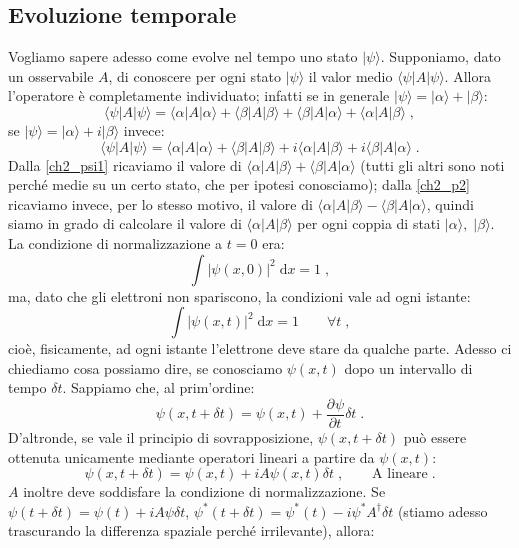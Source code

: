 \documentclass[12pt,a4paper]{report}
\theoremstyle{definition}
\newcommand{\pdev}[3][]{\frac{\partial^{#1} #2}{\partial #3^{#1}}}
\numberwithin{equation}{section}
\newcommand{\diff}[1][]{\mathrm{d}#1}
\newcommand{\bra}{\langle}
\newcommand{\ket}{\rangle}
\begin{document}
\subsection{Evoluzione temporale}
Vogliamo sapere adesso come evolve nel tempo uno stato $|\psi\ket$. Supponiamo, dato un osservabile $A$, di conoscere per ogni stato $|\psi\ket$ il valor medio $\bra\psi|A|\psi\ket$. Allora l'operatore è completamente individuato; infatti se in generale $|\psi\ket=|\alpha\ket+|\beta\ket$:
\begin{equation}
\bra\psi|A|\psi\ket=\bra\alpha|A|\alpha\ket+\bra\beta|A|\beta\ket+\bra\beta|A|\alpha\ket+\bra\alpha|A|\beta\ket\;,\label{ch2_psi1}
\end{equation}
se $|\psi\ket=|\alpha\ket+i|\beta\ket$ invece:
\begin{equation}
\bra\psi|A|\psi\ket=\bra\alpha|A|\alpha\ket+\bra\beta|A|\beta\ket+i\bra\alpha|A|\beta\ket+i\bra\beta|A|\alpha\ket\;.\label{ch2_psi2}
\end{equation}
Dalla \eqref{ch2_psi1} ricaviamo il valore di $\bra\alpha|A|\beta\ket+\bra\beta|A|\alpha\ket$ (tutti gli altri sono noti perché medie su un certo stato, che per ipotesi conosciamo); dalla \eqref{ch2_p2} ricaviamo invece, per lo stesso motivo, il valore di $\bra\alpha|A|\beta\ket-\bra\beta|A|\alpha\ket$, quindi siamo in grado di calcolare il valore di $\bra\alpha|A|\beta\ket$ per ogni coppia di stati $|\alpha\ket,\;|\beta\ket$. \\
La condizione di normalizzazione a $t=0$ era:
$$
\int |\psi(x,0)|^2\;\diff{x}=1\;,
$$
ma, dato che gli elettroni non spariscono, la condizioni vale ad ogni istante:
\begin{equation}
\int |\psi(x,t)|^2\;\diff{x}=1\qquad \forall t\;,
\end{equation}
cioè, fisicamente, ad ogni istante l'elettrone deve stare da qualche parte. Adesso ci chiediamo cosa possiamo dire, se conosciamo $\psi(x,t)$ dopo un intervallo di tempo $\delta t$. Sappiamo che, al prim'ordine:
\begin{equation}
\psi(x,t+\delta t)=\psi(x,t)+\pdev{\psi}{t}\delta t\;.
\end{equation}
D'altronde, se vale il principio di sovrapposizione, $\psi(x,t+\delta t)$ può essere ottenuta unicamente mediante operatori lineari a partire da $\psi(x,t)$:
\begin{equation}
\psi(x,t+\delta t)=\psi(x,t)+iA\psi(x,t)\delta t\;,\qquad \mbox{A lineare}\;.
\end{equation}
$A$ inoltre deve soddisfare la condizione di normalizzazione. Se $\psi(t+\delta t)=\psi(t)+iA\psi\delta t$, $\psi^*(t+\delta t)=\psi^*(t)-i\psi^*A^{\dagger}\delta t$ (stiamo adesso trascurando la differenza spaziale perché irrilevante), allora:
\end{document}
